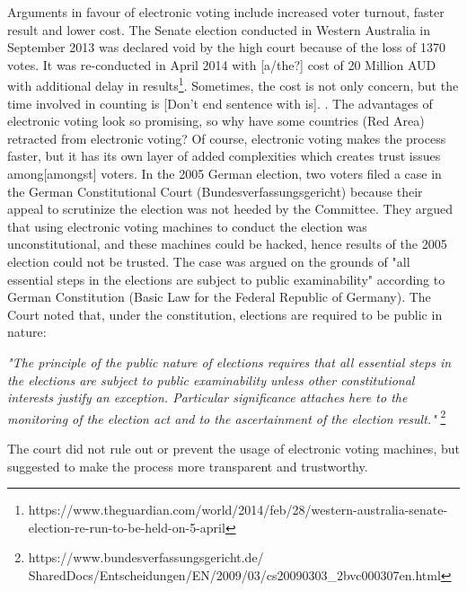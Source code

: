  

   
  Arguments in favour of electronic voting 
  include increased voter turnout, faster result and lower cost. The Senate 
  election conducted in Western Australia in September 2013 was 
  declared void by the high court because of the loss of 1370 votes. It was 
  re-conducted in April 2014 with [a/the?] cost of 20 Million 
  AUD with additional  delay in results\footnote{https://www.theguardian.com/world/2014/feb/28/western-australia-senate-election-re-run-to-be-held-on-5-april}. Sometimes, 
  the cost is not only concern, but the time involved in counting 
  is [Don't end sentence with is]. 
  . 
  The advantages of electronic voting 
  look so promising, so why have some countries (Red Area) retracted 
  from electronic voting? Of course, electronic voting makes 
  the process faster, but it has its own layer of added complexities 
  which creates trust issues among[amongst] voters. 
  In the 2005 German election, two voters filed a case in the German 
  Constitutional Court (Bundesverfassungsgericht) because their 
  appeal to scrutinize the election 
  was not heeded by the Committee. They argued that using electronic 
  voting machines to conduct the election was unconstitutional, and 
  these machines could be hacked, hence results of the 2005 election 
  could not be trusted. The case was argued on the grounds 
  of "all essential steps in the elections are subject to 
  public examinability" according to German Constitution 
  (Basic Law for the Federal Republic of Germany). 
  The Court noted that, under the constitution, elections are 
  required to be public in nature:
  
  \textit{"The principle of the public nature of elections requires that all 
  essential steps in the elections are subject to public examinability
  unless other constitutional interests justify an exception. 
  Particular significance attaches here to the monitoring of the 
  election act and to the ascertainment of the election result."}
  \footnote{https://www.bundesverfassungsgericht.de/
  SharedDocs/Entscheidungen/EN/2009/03/cs20090303\_2bvc000307en.html}
	
  The court did not rule out or prevent the usage of electronic 
  voting machines,  but suggested to make the process more 
  transparent and trustworthy.  
  
